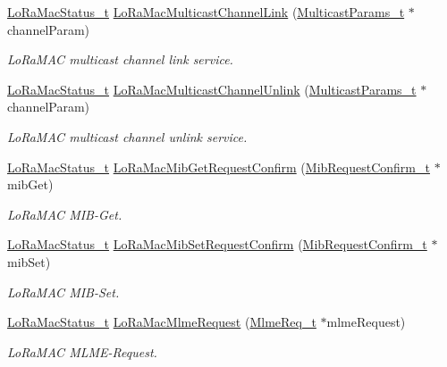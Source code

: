 \begin{DoxyCompactItemize}
\hyperlink{group__LORAMAC_ga30bd25657e10480f8605ee951b0ecfbd}{Lo\+Ra\+Mac\+Status\+\_\+t} \hyperlink{group__LORAMAC_ga89622bf6a1705558ba7b76dbb2d59c2f}{Lo\+Ra\+Mac\+Multicast\+Channel\+Link} (\hyperlink{group__LORAMAC_ga02d2523505cac70954c043074087ea65}{Multicast\+Params\+\_\+t} $\ast$channel\+Param)
\begin{DoxyCompactList}\small\item\em Lo\+Ra\+M\+AC multicast channel link service. \end{DoxyCompactList}\item 
\hyperlink{group__LORAMAC_ga30bd25657e10480f8605ee951b0ecfbd}{Lo\+Ra\+Mac\+Status\+\_\+t} \hyperlink{group__LORAMAC_ga1542a215938fcff1d665ae48b449335e}{Lo\+Ra\+Mac\+Multicast\+Channel\+Unlink} (\hyperlink{group__LORAMAC_ga02d2523505cac70954c043074087ea65}{Multicast\+Params\+\_\+t} $\ast$channel\+Param)
\begin{DoxyCompactList}\small\item\em Lo\+Ra\+M\+AC multicast channel unlink service. \end{DoxyCompactList}\item 
\hyperlink{group__LORAMAC_ga30bd25657e10480f8605ee951b0ecfbd}{Lo\+Ra\+Mac\+Status\+\_\+t} \hyperlink{group__LORAMAC_ga3e208a4f73213aa801eeb9d9da7b71dd}{Lo\+Ra\+Mac\+Mib\+Get\+Request\+Confirm} (\hyperlink{group__LORAMAC_ga9269d5ae88dd157a58e9d60f680d63f0}{Mib\+Request\+Confirm\+\_\+t} $\ast$mib\+Get)
\begin{DoxyCompactList}\small\item\em Lo\+Ra\+M\+AC M\+I\+B-\/\+Get. \end{DoxyCompactList}\item 
\hyperlink{group__LORAMAC_ga30bd25657e10480f8605ee951b0ecfbd}{Lo\+Ra\+Mac\+Status\+\_\+t} \hyperlink{group__LORAMAC_ga7a4ee0ced221591206b09630d4a70844}{Lo\+Ra\+Mac\+Mib\+Set\+Request\+Confirm} (\hyperlink{group__LORAMAC_ga9269d5ae88dd157a58e9d60f680d63f0}{Mib\+Request\+Confirm\+\_\+t} $\ast$mib\+Set)
\begin{DoxyCompactList}\small\item\em Lo\+Ra\+M\+AC M\+I\+B-\/\+Set. \end{DoxyCompactList}\item 
\hyperlink{group__LORAMAC_ga30bd25657e10480f8605ee951b0ecfbd}{Lo\+Ra\+Mac\+Status\+\_\+t} \hyperlink{group__LORAMAC_ga097113f30feecc17c780940ff74af33e}{Lo\+Ra\+Mac\+Mlme\+Request} (\hyperlink{group__LORAMAC_ga5a32f5920a7a3d04435c142be7f38b19}{Mlme\+Req\+\_\+t} $\ast$mlme\+Request)
\begin{DoxyCompactList}\small\item\em Lo\+Ra\+M\+AC M\+L\+M\+E-\/\+Request. \end{DoxyCompactList}\item 

\end{DoxyCompactItemize}
